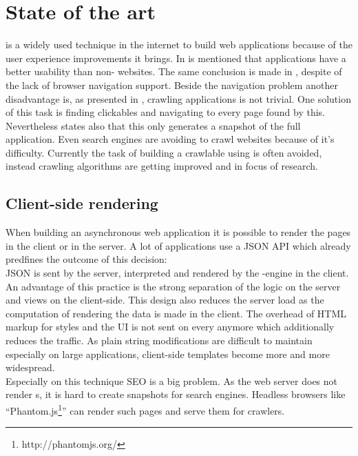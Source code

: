 \section{State of the art}
\ajax{} is a widely used technique in the internet to build web applications because of the user experience improvements it brings.
In \cite{roodt2006effect} is mentioned that \ajax{} applications have a better usability than non-\ajax{} websites.
The same conclusion is made in \cite{kluge2007effects}, despite of the lack of browser navigation support.
Beside the navigation problem another disadvantage is, as presented in \cite{mesbah2009analysis}, crawling \ajax{} applications is not trivial.
One solution of this task is finding clickables and navigating to every page found by this.
Nevertheless \cite{mesbah2009analysis} states also that this only generates a snapshot of the full application.
Even search engines are avoiding to crawl websites because of it's difficulty\cite{duda2009ajax}.
Currently the task of building a crawlable \singlePageApplication{} using \ajax{} is often avoided, instead crawling algorithms are getting improved and in focus of research.

\subsection{Client-side rendering\label{clientSideRendering}}
When building an asynchronous web application it is possible to render the pages in the client or in the server.
A lot of \ajax{} applications use a JSON API which already predfines the outcome of this decision:
\\
JSON is sent by the server, interpreted and rendered by the \ajax{}-engine in the client.
An advantage of this practice is the strong separation of the logic on the server and views on the client-side.
This \webApplication{} design also reduces the server load as the computation of rendering the data is made in the client.
The overhead of HTML markup for styles and the UI is not sent on every \webPage{} anymore which additionally reduces the traffic.
As plain string modifications are difficult to maintain especially on large applications, client-side templates become more and more widespread.
\\
Especially on this technique SEO is a big problem.
As the web server does not render \webPage{}s, it is hard to create snapshots for search engines.
Headless browsers like \enquote{Phantom.js\footnote{http://phantomjs.org/}} can render such pages and serve them for crawlers.

